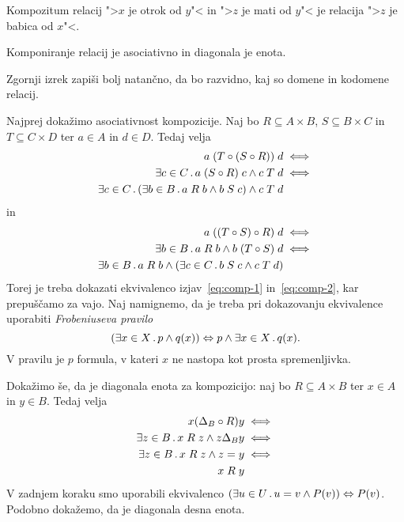 \begin{zgled}
  Kompozitum relacij ">$x$ je otrok od $y$"< in ">$z$ je mati od $y$"< je relacija
  ">$z$ je babica od $x$"<.
\end{zgled}

\begin{izrek}
  Komponiranje relacij je asociativno in diagonala je enota.
\end{izrek}

\begin{vaja}
  Zgornji izrek zapiši bolj natančno, da bo razvidno, kaj so domene in kodomene relacij.
\end{vaja}

\begin{dokaz}
  Najprej dokažimo asociativnost kompozicije.
  Naj bo $R \subseteq A \times B$, $S \subseteq B \times C$ in $T \subseteq C \times D$ ter $a \in A$ in $d \in D$. Tedaj velja
  \begin{align}
    a \rel{(T \circ (S \circ R))} d &\iff  \notag \\
    \some{c \in C} a \rel{(S \circ R)} c \land c \rel{T} d &\iff \notag \\
    \some{c \in C} (\some{b \in B} a \rel{R} b \land b \rel{S} c) \land c \rel{T} d \label{eq:comp-1}
  \end{align}
  in
  \begin{align}
    a \rel{((T \circ S) \circ R)} d &\iff \notag \\
    \some{b \in B} a \rel{R} b \land b \rel{(T \circ S)} d &\iff \notag \\
    \some{b \in B} a \rel{R} b \land (\some{c \in C} b \rel{S} c \land c \rel{T} d) \label{eq:comp-2}
  \end{align}
  Torej je treba dokazati ekvivalenco izjav~\eqref{eq:comp-1} in~\eqref{eq:comp-2}, kar prepuščamo za vajo. Naj namignemo, da je treba pri dokazovanju ekvivalence uporabiti \emph{Frobeniuseva pravilo}
  \begin{equation*}
    (\some{x \in X} p \land q(x)) \liff p \land \some{x \in X} q(x).
  \end{equation*}
  V pravilu je $p$ formula, v kateri $x$ ne nastopa kot prosta spremenljivka.

  Dokažimo še, da je diagonala enota za kompozicijo: naj bo $R \subseteq A \times B$ ter $x \in A$ in $y \in B$. Tedaj velja
  \begin{align*}
    x (\diag[B] \circ R) y &\iff \\
    \some{z \in B} x \rel{R} z \land z \diag[B] y  &\iff \\
    \some{z \in B} x \rel{R} z \land z = y &\iff \\
    x \rel{R} y
  \end{align*}
  V zadnjem koraku smo uporabili ekvivalenco $(\some{u \in U} u = v \land P(v)) \liff P(v)$. Podobno dokažemo, da je diagonala desna enota.
\end{dokaz}

